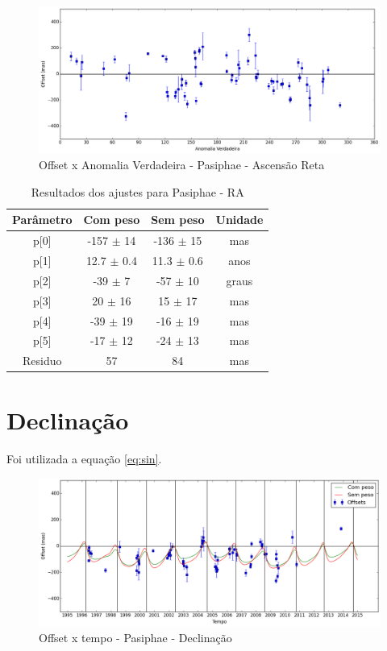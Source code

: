 \documentclass[11pt,a4paper]{report}
\begin{document}
\begin{figure}[h]
\caption{Offset x Anomalia Verdadeira - Pasiphae - Ascensão Reta}
\includegraphics[scale=0.45]{Pasiphae/RA_anom.png}  
\end{figure}

\begin{table}[h!]
\caption{\label{Tab: Pasiphae-RA} Resultados dos ajustes para Pasiphae - RA}
\begin{centering}
\begin{tabular}{cccc}
\hline
\hline
Parâmetro & Com peso & Sem peso & Unidade\tabularnewline
\hline
p[0] & -157 $\pm$ 14 & -136 $\pm$ 15 & mas\\
p[1] & 12.7 $\pm$ 0.4 & 11.3 $\pm$ 0.6 & anos\\
p[2] & -39 $\pm$ 7 & -57 $\pm$ 10 & graus\\
p[3] & 20 $\pm$ 16 & 15 $\pm$ 17 & mas\\
p[4] & -39 $\pm$ 19 & -16 $\pm$ 19 & mas\\
p[5] & -17 $\pm$ 12 & -24 $\pm$ 13 & mas\\
Residuo & 57 & 84 & mas\\
\hline 
\end{tabular} 
\par\end{centering}
\end{table}

\section*{Declinação}

Foi utilizada a equação \ref{eq:sin}.

\begin{figure}[h]
\caption{Offset x tempo - Pasiphae - Declinação}
\includegraphics[scale=0.45]{Pasiphae/DEC.png} 
\end{figure}
\end{document}
